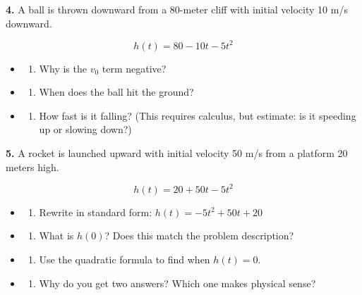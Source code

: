 \documentclass[
  11pt,
]{article}
\providecommand{\tightlist}{%
  \setlength{\itemsep}{0pt}\setlength{\parskip}{0pt}}
\begin{document}
\textbf{4.} A ball is thrown downward from a 80-meter cliff with initial
velocity 10 m/s downward.

\[h(t) = 80 - 10t - 5t^2\]

\begin{itemize}
\item
  \begin{enumerate}
  \def\labelenumi{(\alph{enumi})}
  \tightlist
  \item
    Why is the \(v_0\) term negative?
  \end{enumerate}
\item
  \begin{enumerate}
  \def\labelenumi{(\alph{enumi})}
  \setcounter{enumi}{1}
  \tightlist
  \item
    When does the ball hit the ground?
  \end{enumerate}
\item
  \begin{enumerate}
  \def\labelenumi{(\alph{enumi})}
  \setcounter{enumi}{2}
  \tightlist
  \item
    How fast is it falling? (This requires calculus, but estimate: is it
    speeding up or slowing down?)
  \end{enumerate}
\end{itemize}

\textbf{5.} A rocket is launched upward with initial velocity 50 m/s
from a platform 20 meters high.

\[h(t) = 20 + 50t - 5t^2\]

\begin{itemize}
\item
  \begin{enumerate}
  \def\labelenumi{(\alph{enumi})}
  \tightlist
  \item
    Rewrite in standard form: \(h(t) = -5t^2 + 50t + 20\)
  \end{enumerate}
\item
  \begin{enumerate}
  \def\labelenumi{(\alph{enumi})}
  \setcounter{enumi}{1}
  \tightlist
  \item
    What is \(h(0)\)? Does this match the problem description?
  \end{enumerate}
\item
  \begin{enumerate}
  \def\labelenumi{(\alph{enumi})}
  \setcounter{enumi}{2}
  \tightlist
  \item
    Use the quadratic formula to find when \(h(t) = 0\).
  \end{enumerate}
\item
  \begin{enumerate}
  \def\labelenumi{(\alph{enumi})}
  \setcounter{enumi}{3}
  \tightlist
  \item
    Why do you get two answers? Which one makes physical sense?
  \end{enumerate}
\end{itemize}
\end{document}
